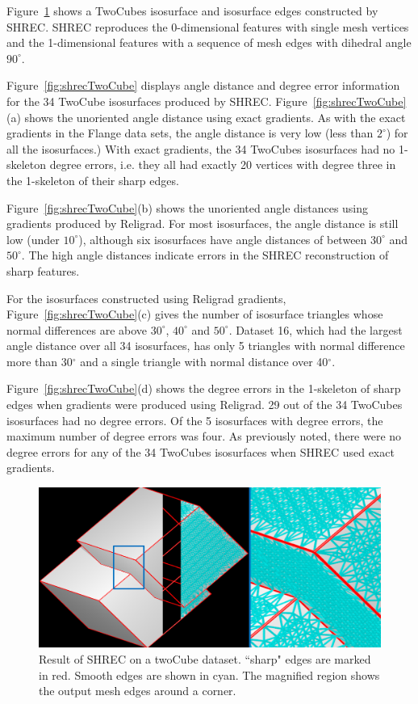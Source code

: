 Figure~\ref{fig:shrecPerfect1} shows a TwoCubes isosurface
and isosurface edges constructed by SHREC.
SHREC reproduces the 0-dimensional features with single mesh vertices
and the 1-dimensional features with a sequence of mesh edges
with dihedral angle $90^\circ$.

Figure~\ref{fig:shrecTwoCube} displays angle distance and degree error
information for the 34 TwoCube isosurfaces produced by SHREC.
Figure~\ref{fig:shrecTwoCube}(a) shows the unoriented angle distance
using exact gradients.
As with the exact gradients in the Flange data sets,
the angle distance is very low (less than $2^\circ$)
for all the isosurfaces.)
With exact gradients, the 34 TwoCubes isosurfaces 
had no 1-skeleton degree errors, 
i.e. they all had exactly 20 vertices with degree three 
in the 1-skeleton of their sharp edges.

Figure~\ref{fig:shrecTwoCube}(b) shows the unoriented angle distances
using gradients produced by Religrad.
For most isosurfaces, the angle distance is still low (under $10^\circ$),
although six isosurfaces have angle distances of between $30^\circ$
and $50^\circ$.
The high angle distances indicate errors in the SHREC reconstruction 
of sharp features.

For the isosurfaces constructed using Religrad gradients,
Figure~\ref{fig:shrecTwoCube}(c) gives
the number of isosurface triangles whose normal differences
are above $30^\circ$, $40^\circ$ and $50^\circ$.
Dataset 16, which had the largest angle distance over all 34 isosurfaces,
has only 5 triangles with normal difference more than 30$^\circ$ 
and a single triangle with normal distance over 40$^\circ$.  

Figure~\ref{fig:shrecTwoCube}(d) shows
the degree errors in the 1-skeleton of sharp edges
when gradients were produced using Religrad.
29 out of the 34 TwoCubes isosurfaces had no degree errors.
Of the 5 isosurfaces with degree errors,
the maximum number of degree errors was four.
As previously noted,
there were no degree errors for any of the 34 TwoCubes isosurfaces
when SHREC used exact gradients.

\begin{figure}[t]
	\includegraphics[width=\linewidth]{images/shrecPerfect.eps}
	\caption{Result of SHREC on a twoCube dataset. ``sharp" edges are marked in red. Smooth edges are shown in cyan. The magnified region shows the output mesh edges around a corner.}
	\label{fig:shrecPerfect1}
\end{figure}

